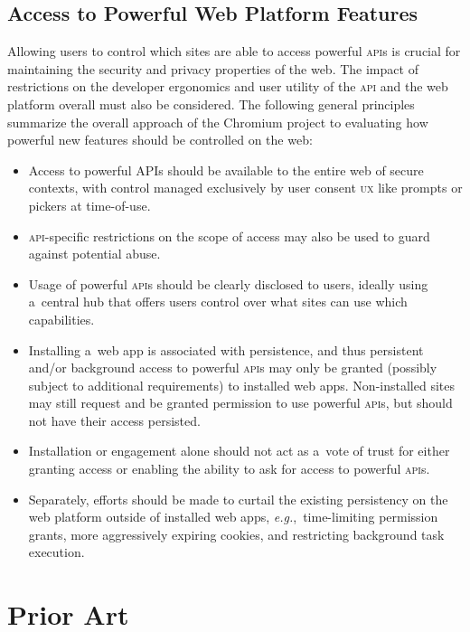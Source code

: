 \documentclass[sigconf]{acmart}
\begin{document}
\subsection{Access to Powerful Web Platform Features}

Allowing users to control which sites are able to access powerful \textsc{api}s
is crucial for maintaining the security and privacy properties of the web.
The impact of restrictions on the developer ergonomics and user utility
of the \textsc{api} and the web platform overall must also be considered.
The following general principles~\cite{ng19} summarize the overall approach of the Chromium project
to evaluating how powerful new features should be controlled on the web:

\begin{itemize}
  \item Access to powerful APIs should be available to the entire web of secure contexts,
    with control managed exclusively by user consent \textsc{ux} like prompts or pickers at time-of-use.
  \item \textsc{api}-specific restrictions on the scope of access may also be used
    to guard against potential abuse.
  \item Usage of powerful \textsc{api}s should be clearly disclosed to users,
    ideally using a~central hub that offers users control over what sites
    can use which capabilities.
  \item Installing a~web app is associated with persistence,
    and thus persistent and/or background access to powerful \textsc{api}s
    may only be granted (possibly subject to additional requirements) to installed web apps.
    Non-installed sites may still request and be granted permission to use powerful \textsc{api}s,
    but should not have their access persisted.
  \item Installation or engagement alone should not act as a~vote of trust
    for either granting access or enabling the ability to ask for access to powerful \textsc{api}s.
   \item Separately, efforts should be made to curtail the existing persistency
    on the web platform outside of installed web apps, \textit{e.g.},\ time-limiting permission grants,
    more aggressively expiring cookies, and restricting background task execution.
\end{itemize}

\section{Prior Art}
\end{document}

